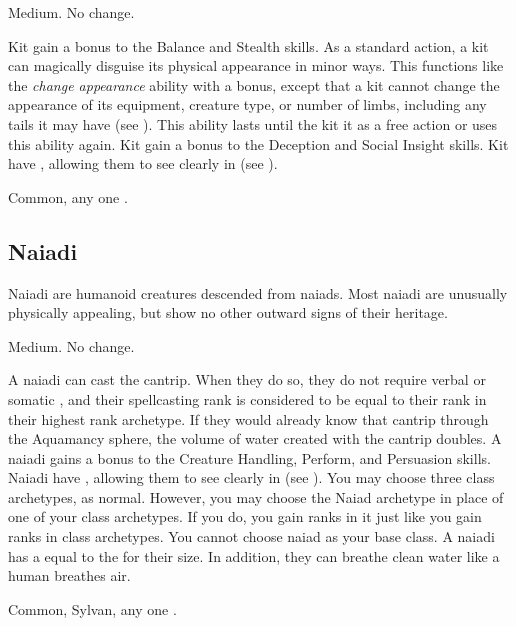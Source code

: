          Medium.
         No change.
        \begin{itemize}
             Kit gain a  bonus to the Balance and Stealth skills.
             As a standard action, a kit can magically disguise its physical appearance in minor ways.
                This functions like the \textit{change appearance} ability with a  bonus, except that a kit cannot change the appearance of its equipment, creature type, or number of limbs, including any tails it may have (see ).
                This ability lasts until the kit  it as a free action or uses this ability again.
             Kit gain a  bonus to the Deception and Social Insight skills.
             Kit have , allowing them to see clearly in  (see ).
        \end{itemize}
         Common, any one .

    \subsection{Naiadi}
        Naiadi are humanoid creatures descended from naiads.
        Most naiadi are unusually physically appealing, but show no other outward signs of their heritage.

         Medium.
         No change.
        \begin{itemize}
             A naiadi can cast the  cantrip.
                When they do so, they do not require verbal or somatic , and their spellcasting rank is considered to be equal to their rank in their highest rank archetype.
                If they would already know that cantrip through the Aquamancy sphere, the volume of water created with the cantrip doubles.
             A naiadi gains a  bonus to the Creature Handling, Perform, and Persuasion skills.
             Naiadi have , allowing them to see clearly in  (see ).
             You may choose three class archetypes, as normal.
                However, you may choose the Naiad archetype in place of one of your class archetypes.
                If you do, you gain ranks in it just like you gain ranks in class archetypes.
                You cannot choose naiad as your base class.
             A naiadi has a  equal to the  for their size.
                In addition, they can breathe clean water like a human breathes air.
        \end{itemize}
         Common, Sylvan, any one .

